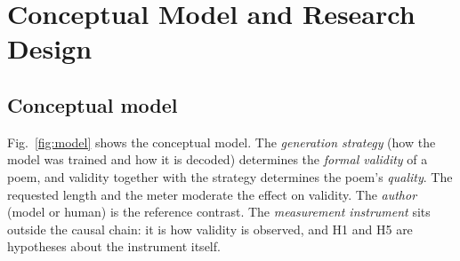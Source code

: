 \section{Conceptual Model and Research Design}
\label{sec:design}

\subsection{Conceptual model}
Fig.~\ref{fig:model} shows the conceptual model. The \emph{generation strategy} (how the model was trained and how it
is decoded) determines the \emph{formal validity} of a poem, and validity together with the strategy determines the
poem's \emph{quality}. The requested length and the meter moderate the effect on validity. The \emph{author}
(model or human) is the reference contrast. The \emph{measurement instrument} sits outside the causal chain: it is how
validity is observed, and H1 and H5 are hypotheses about the instrument itself.

